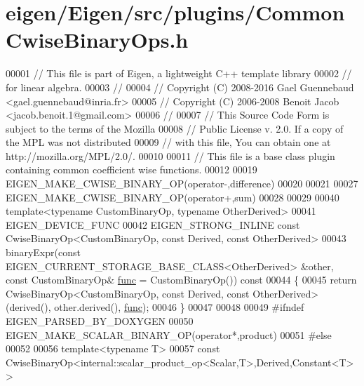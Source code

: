 \hypertarget{eigen_2_eigen_2src_2plugins_2_common_cwise_binary_ops_8h_source}{}\section{eigen/\+Eigen/src/plugins/\+Common\+Cwise\+Binary\+Ops.h}
\label{eigen_2_eigen_2src_2plugins_2_common_cwise_binary_ops_8h_source}

\begin{DoxyCode}
00001 \textcolor{comment}{// This file is part of Eigen, a lightweight C++ template library}
00002 \textcolor{comment}{// for linear algebra.}
00003 \textcolor{comment}{//}
00004 \textcolor{comment}{// Copyright (C) 2008-2016 Gael Guennebaud <gael.guennebaud@inria.fr>}
00005 \textcolor{comment}{// Copyright (C) 2006-2008 Benoit Jacob <jacob.benoit.1@gmail.com>}
00006 \textcolor{comment}{//}
00007 \textcolor{comment}{// This Source Code Form is subject to the terms of the Mozilla}
00008 \textcolor{comment}{// Public License v. 2.0. If a copy of the MPL was not distributed}
00009 \textcolor{comment}{// with this file, You can obtain one at http://mozilla.org/MPL/2.0/.}
00010 
00011 \textcolor{comment}{// This file is a base class plugin containing common coefficient wise functions.}
00012 
00019 EIGEN\_MAKE\_CWISE\_BINARY\_OP(\textcolor{keyword}{operator}-,difference)
00020 
00021 
00027 EIGEN\_MAKE\_CWISE\_BINARY\_OP(\textcolor{keyword}{operator}+,sum)
00028 
00029 
00040 \textcolor{keyword}{template}<\textcolor{keyword}{typename} CustomBinaryOp, \textcolor{keyword}{typename} OtherDerived>
00041 EIGEN\_DEVICE\_FUNC
00042 EIGEN\_STRONG\_INLINE \textcolor{keyword}{const} CwiseBinaryOp<CustomBinaryOp, const Derived, const OtherDerived>
00043 binaryExpr(\textcolor{keyword}{const} EIGEN\_CURRENT\_STORAGE\_BASE\_CLASS<OtherDerived> &other, \textcolor{keyword}{const} CustomBinaryOp& 
      \hyperlink{structfunc}{func} = CustomBinaryOp())\textcolor{keyword}{ const}
00044 \textcolor{keyword}{}\{
00045   \textcolor{keywordflow}{return} CwiseBinaryOp<CustomBinaryOp, const Derived, const OtherDerived>(derived(), other.derived(), 
      \hyperlink{structfunc}{func});
00046 \}
00047 
00048 
00049 \textcolor{preprocessor}{#ifndef EIGEN\_PARSED\_BY\_DOXYGEN}
00050 EIGEN\_MAKE\_SCALAR\_BINARY\_OP(\textcolor{keyword}{operator}*,product)
00051 \textcolor{preprocessor}{#else}
00052 
00056 \textcolor{keyword}{template}<\textcolor{keyword}{typename} T>
00057 \textcolor{keyword}{const} CwiseBinaryOp<internal::scalar\_product\_op<Scalar,T>,Derived,Constant<T> > 

\end{DoxyCode}
